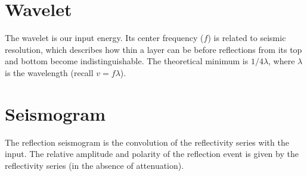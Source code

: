 \documentclass{article}[11pt,oneside]
\begin{document}
\section*{Wavelet}
The wavelet is our input energy. Its center frequency ($f$) is related to seismic resolution, which describes how thin a layer can be before reflections from its top and bottom become indistinguishable. The theoretical minimum is $1/4 \lambda$, where $\lambda$ is the wavelength (recall $v = f\lambda$).

\section*{Seismogram}
The reflection seismogram is the convolution of the reflectivity series with the input. The relative amplitude and polarity of the reflection event is given by the reflectivity series (in the absence of attenuation).
\end{document}
